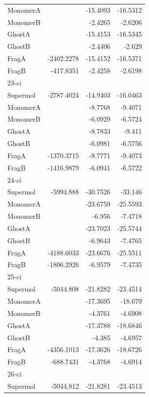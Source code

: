 \documentclass[journal=jctcce,manuscript=article]{achemso}
\begin{document}
\begin{spacing}{1}
\begin{longtable}{lRRR}
    MonomerA &       & -15.4093 & -16.5312 \\
    MonomerB &       & -2.4265 & -2.6206 \\
    GhostA &       & -15.4153 & -16.5345 \\
    GhostB &       & -2.4406 & -2.629 \\
    FragA & -2402.2278 & -15.4152 & -16.5371 \\
    FragB & -417.8351 & -2.4258 & -2.6198 \\
    23-ci &       &       &  \\
    Supermol & -2787.4024 & -14.9403 & -16.0463 \\
    MonomerA &       & -8.7768 & -9.4071 \\
    MonomerB &       & -6.0929 & -6.5724 \\
    GhostA &       & -8.7833 & -9.411 \\
    GhostB &       & -6.0981 & -6.5756 \\
    FragA & -1370.3715 & -8.7771 & -9.4073 \\
    FragB & -1416.9879 & -6.0941 & -6.5722 \\
    24-ci &       &       &  \\
    Supermol & -5994.888 & -30.7526 & -33.146 \\
    MonomerA &       & -23.6759 & -25.5593 \\
    MonomerB &       & -6.956 & -7.4718 \\
    GhostA &       & -23.7023 & -25.5744 \\
    GhostB &       & -6.9643 & -7.4765 \\
    FragA & -4188.6033 & -23.6676 & -25.5511 \\
    FragB & -1806.2926 & -6.9579 & -7.4735 \\
    25-ci &       &       &  \\
    Supermol & -5044.808 & -21.8282 & -23.4514 \\
    MonomerA &       & -17.3695 & -18.679 \\
    MonomerB &       & -4.3761 & -4.6908 \\
    GhostA &       & -17.3788 & -18.6846 \\
    GhostB &       & -4.385 & -4.6957 \\
    FragA & -4356.1013 & -17.3626 & -18.6726 \\
    FragB & -688.7431 & -4.3768 & -4.6914 \\
    26-ci &       &       &  \\
    Supermol & -5044.812 & -21.8281 & -23.4513 \\

\end{longtable}
\end{spacing}
\end{document}
